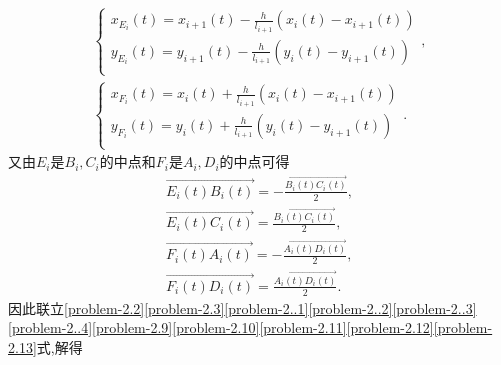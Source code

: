 \documentclass[lang=cn,newtx,10pt,scheme=chinese]{../Template/elegantbook}
\begin{document}
\begin{gather}
\begin{cases}
x_{E_i}\left( t \right) =x_{i+1}\left( t \right) -\frac{h}{l_{i+1}}\left( x_i\left( t \right) -x_{i+1}\left( t \right) \right)\\
y_{E_i}\left( t \right) =y_{i+1}\left( t \right) -\frac{h}{l_{i+1}}\left( y_i\left( t \right) -y_{i+1}\left( t \right) \right)\\
\end{cases},\label{problem-2.9}
\\
\begin{cases}
x_{F_i}\left( t \right) =x_i\left( t \right) +\frac{h}{l_{i+1}}\left( x_i\left( t \right) -x_{i+1}\left( t \right) \right)\\
y_{F_i}\left( t \right) =y_i\left( t \right) +\frac{h}{l_{i+1}}\left( y_i\left( t \right) -y_{i+1}\left( t \right) \right)\\
\end{cases}.\label{problem-2.10}
\end{gather}
又由$E_i$是$B_i,C_{i}$的中点和$F_i$是$A_i,D_i$的中点可得
\begin{gather}
\overrightarrow{E_i\left( t \right) B_i\left( t \right) }=-\frac{\overrightarrow{B_i\left( t \right) C_i\left( t \right) }}{2},\label{problem-2.11}
\\
\overrightarrow{E_i\left( t \right) C_i\left( t \right) }=\frac{\overrightarrow{B_i\left( t \right) C_i\left( t \right) }}{2},\label{problem-2.12}
\\
\overrightarrow{F_i\left( t \right) A_i\left( t \right) }=-\frac{\overrightarrow{A_i\left( t \right) D_i\left( t \right) }}{2},\label{problem-2.13}
\\
\overrightarrow{F_i\left( t \right) D_i\left( t \right) }=\frac{\overrightarrow{A_i\left( t \right) D_i\left( t \right) }}{2}.   \label{problem-2.14} 
\end{gather}
因此联立\eqref{problem-2.2}\eqref{problem-2.3}\eqref{problem-2..1}\eqref{problem-2..2}\eqref{problem-2..3}\eqref{problem-2..4}\eqref{problem-2.9}\eqref{problem-2.10}\eqref{problem-2.11}\eqref{problem-2.12}\eqref{problem-2.13}式,解得
\end{document}
